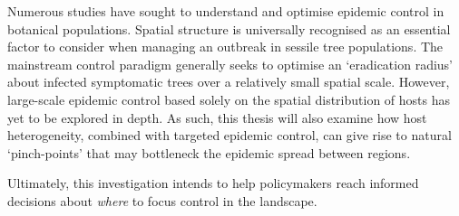 Numerous studies have sought to understand and optimise epidemic control in botanical populations. Spatial structure is universally recognised as an essential factor to consider when managing an outbreak in sessile tree populations. The mainstream control paradigm generally seeks to optimise an `eradication radius' about infected symptomatic trees over a relatively small spatial scale. However, large-scale epidemic control based solely on the spatial distribution of hosts has yet to be explored in depth. 
As such, this thesis will also examine how host heterogeneity, combined with targeted epidemic control, can give rise to natural `pinch-points' that may bottleneck the epidemic spread between regions. 

Ultimately, this investigation intends to help policymakers reach informed decisions about \textit{where} to focus control in the landscape.



\newcommand{\RNum}[1]{\uppercase\expandafter{\romannumeral #1\relax}}

